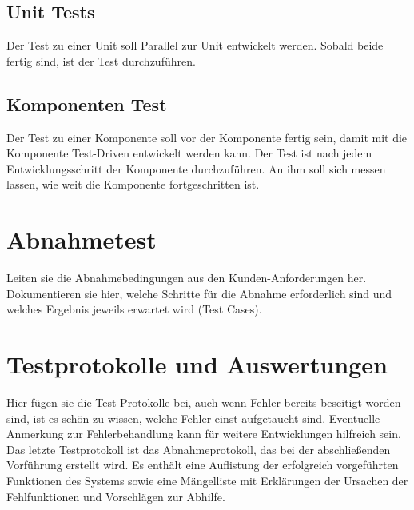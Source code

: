 \subsection{Unit Tests}
Der Test zu einer Unit soll Parallel zur Unit entwickelt werden. Sobald beide fertig sind, ist der Test durchzuführen.
\subsection{Komponenten Test}
Der Test zu einer Komponente soll vor der Komponente fertig sein, damit mit die Komponente Test-Driven entwickelt werden kann.
Der Test ist nach jedem Entwicklungsschritt der Komponente durchzuführen. An ihm soll sich messen lassen, wie weit die Komponente fortgeschritten ist.
\

\section{Abnahmetest}

Leiten sie die Abnahmebedingungen aus den Kunden-Anforderungen her.
Dokumentieren sie hier, welche Schritte für die Abnahme erforderlich
sind und welches Ergebnis jeweils erwartet wird (Test Cases).

\section{Testprotokolle und Auswertungen}

Hier fügen sie die Test Protokolle bei, auch wenn Fehler bereits
beseitigt worden sind, ist es schön zu wissen, welche Fehler einst
aufgetaucht sind. Eventuelle Anmerkung zur Fehlerbehandlung kann für
weitere Entwicklungen hilfreich sein.
Das letzte Testprotokoll ist das Abnahmeprotokoll, das bei der
abschließenden Vorführung erstellt wird. Es enthält eine Auflistung der
erfolgreich vorgeführten Funktionen des Systems sowie eine Mängelliste
mit Erklärungen der Ursachen der Fehlfunktionen und Vorschlägen zur
Abhilfe.

